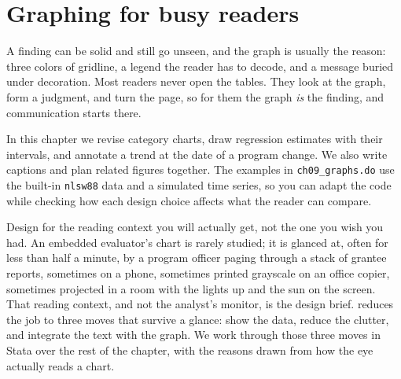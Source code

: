 \documentclass[
    a4paper,
    fontsize=10pt,
    twoside=true,
    numbers=noenddot,
]{kaobook}
\begin{document}

\chapter{Graphing for busy readers}\label{ch:graphs}

A finding can be solid and still go unseen, and the graph is usually the reason: three colors of gridline, a legend the reader has to decode, and a message buried under decoration. Most readers never open the tables. They look at the graph, form a judgment, and turn the page, so for them the graph \emph{is} the finding, and communication starts there.

In this chapter we revise category charts, draw regression estimates with their intervals, and annotate a trend at the date of a program change. We also write captions and plan related figures together. The examples in \texttt{ch09\_graphs.do} use the built-in \texttt{nlsw88} data and a simulated time series, so you can adapt the code while checking how each design choice affects what the reader can compare.

Design for the reading context you will actually get, not the one you wish you had. An embedded evaluator's chart is rarely studied; it is glanced at, often for less than half a minute, by a program officer paging through a stack of grantee reports, sometimes on a phone, sometimes printed grayscale on an office copier, sometimes projected in a room with the lights up and the sun on the screen. That reading context, and not the analyst's monitor, is the design brief. \textcite{schwabish2014economist} reduces the job to three moves that survive a glance: show the data, reduce the clutter, and integrate the text with the graph. We work through those three moves in Stata over the rest of the chapter, with the reasons drawn from how the eye actually reads a chart.
\end{document}
